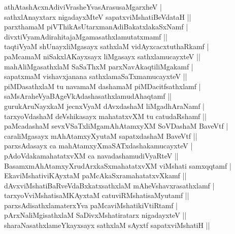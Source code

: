 \begin{entry}
\smallskip
\begin{shl}
athAtashAcxnAdiviVrasheYvasArasusaMgarxheV |\\
sathxlAnayxtarx nigadayxMteV sapatxviMshatiBeVdataH ||\\
parxthamaM piVThikAsUtarxmanAdiBakatxlakaSxNamf |\\
divxtiVyamAdirahitajaMgamasathxlamutatxmamf ||\\
taqtiVyaM shUnayxliMgasayx sathxlaM vidAyxcacxtuthaRkamf |\\
paMcamaM niSakxlAKayxsayx liMgasayx sathxlamucayxteV ||\\
mahAliMgasathxlaM SaSaThxM parxNavAkaqtiliMgakamf |\\
sapatxmaM vishavxjanana sathxlamaSaTxmamucayxteV ||\\
piMDasathxlaM tu navamaM dashamaM piMDacitfsathxlamf |\\
saMsAraheVyaBAgeVkAdashasathxlamudAhaqtamf ||\\
gurukAruNayxkaM jecnxVyaM dAvxdashaM liMgadhAraNamf |\\
tarxyoVdashaM deVshikasayx mahatatxvXM tu catudaRshamf ||\\
paMcadashaM sevxVSaTxliMgamAhAtamxyXM SoVDashaM BaveVtf |\\
caraliMgasayx mAhAtamxyXyutaM sapatxdashaM BaveVtf ||\\
parxsAdasayx ca mahAtamxyXmaSATxdashakamucayxteV |\\
pAdoVdakamahatatxvXM ca navadashamudiVyaRteV ||\\
BasamxmAhAtamxyXrudArxkaSxmahatatxvXM viMshati samxqqtamf |\\
EkaviMshativiKAyxtaM paMcAkaSxramahatatxvXkamf ||\\
dAvxviMshatiBaRveVdaBxkatxsathxlaM mAheVshavxrasathxlamf |\\
tarxyoVviMshatisaMKAyxtaM catuviRMshatisaMyutamf ||\\
parxsAdisathxlamaterxYva paMcaviMshatikiVtiRtamf |\\
pArxNaliMgisathxlaM SaDivxMshatiratarx nigadayxteV ||\\
sharaNasathxlameYkayxsayx sathxlaM sAyxtf sapatxviMshatiH ||
\end{shl}
\smallskip
{}
\end{entry}

